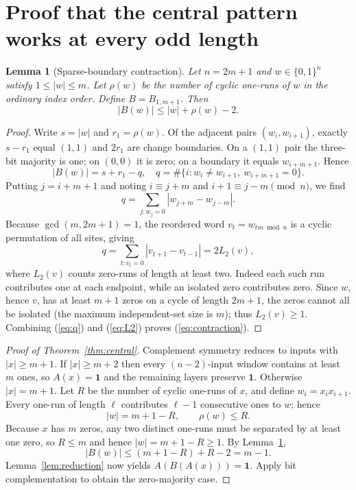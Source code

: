 \documentclass[11pt,a4paper]{article}
\newtheorem{lemma}[theorem]{Lemma}
\newcommand{\wt}[1]{\lvert #1\rvert}
\newcommand{\ind}{\boldsymbol{1}}
\begin{document}
\section{Proof that the central pattern works at every odd length}
\begin{lemma}[Sparse-boundary contraction]\label{lem:boundary}
Let $n=2m+1$ and $w\in\{0,1\}^n$ satisfy $1\le\wt{w}\le m$. Let $\rho(w)$ be the number of cyclic one-runs of $w$ in the ordinary index order. Define $B=B_{1,m+1}$. Then
\begin{equation}\label{eq:contraction}
\wt{B(w)}\le\wt{w}+\rho(w)-2.
\end{equation}
\end{lemma}
\begin{proof}
Write $s=\wt{w}$ and $r_1=\rho(w)$. Of the adjacent pairs $(w_i,w_{i+1})$, exactly $s-r_1$ equal $(1,1)$ and $2r_1$ are change boundaries. On a $(1,1)$ pair the three-bit majority is one; on $(0,0)$ it is zero; on a boundary it equals $w_{i+m+1}$. Hence
\begin{equation}\label{eq:q}
\wt{B(w)}=s+r_1-q,\quad q=\#\{i:w_i\ne w_{i+1},\ w_{i+m+1}=0\}.
\end{equation}
Putting $j=i+m+1$ and noting $i\equiv j+m$ and $i+1\equiv j-m\pmod n$, we find
\[
q=\sum_{j:w_j=0}|w_{j+m}-w_{j-m}|.
\]
Because $\gcd(m,2m+1)=1$, the reordered word $v_t=w_{tm\bmod n}$ is a cyclic permutation of all sites, giving
\begin{equation}\label{eq:L2}
q=\sum_{t:v_t=0}|v_{t+1}-v_{t-1}|=2L_2(v),
\end{equation}
where $L_2(v)$ counts zero-runs of length at least two. Indeed each such run contributes one at each endpoint, while an isolated zero contributes zero. Since $w$, hence $v$, has at least $m+1$ zeros on a cycle of length $2m+1$, the zeros cannot all be isolated (the maximum independent-set size is $m$); thus $L_2(v)\ge1$. Combining (\ref{eq:q}) and (\ref{eq:L2}) proves (\ref{eq:contraction}).
\end{proof}

\begin{proof}[Proof of Theorem~\ref{thm:central}]
Complement symmetry reduces to inputs with $\wt{x}\ge m+1$. If $\wt{x}\ge m+2$ then every $(n-2)$-input window contains at least $m$ ones, so $A(x)=\ind$ and the remaining layers preserve $\ind$. Otherwise $\wt{x}=m+1$. Let $R$ be the number of cyclic one-runs of $x$, and define $w_i=x_ix_{i+1}$. Every one-run of length $\ell$ contributes $\ell-1$ consecutive ones to $w$; hence
\[
\wt{w}=m+1-R,\qquad \rho(w)\le R.
\]
Because $x$ has $m$ zeros, any two distinct one-runs must be separated by at least one zero, so $R\le m$ and hence $\wt{w}=m+1-R\ge1$. By Lemma~\ref{lem:boundary},
\[
\wt{B(w)}\le(m+1-R)+R-2=m-1.
\]
Lemma~\ref{lem:reduction} now yields $A(B(A(x)))=\ind$. Apply bit complementation to obtain the zero-majority case.
\end{proof}
\end{document}
